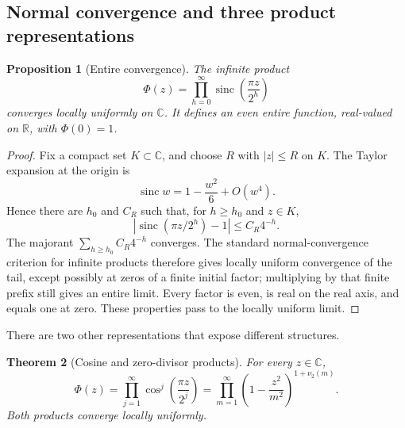 \documentclass[11pt,oneside]{article}
\numberwithin{equation}{section}
\newtheorem{theorem}{Theorem}[section]
\newtheorem{proposition}[theorem]{Proposition}
\theoremstyle{definition}
\theoremstyle{remark}
\newcommand{\R}{\mathbb R}
\newcommand{\C}{\mathbb C}
\newcommand{\abs}[1]{\left|#1\right|}
\newcommand{\sinc}{\operatorname{sinc}}
\newcommand{\PhiUp}{\Phi}
\newcommand{\nuTwo}{\nu_2}
\begin{document}
\subsection{Normal convergence and three product representations}

\begin{proposition}[Entire convergence]
\label{prop:entire-convergence}
The infinite product
\begin{equation}
 \PhiUp(z)=\prod_{h=0}^{\infty}\sinc\!\left(\frac{\pi z}{2^h}\right)
 \label{eq:Phi-def}
\end{equation}
converges locally uniformly on \(\C\).  It defines an even entire function, real-valued on
\(\R\), with \(\PhiUp(0)=1\).
\end{proposition}

\begin{proof}
Fix a compact set \(K\subset\C\), and choose \(R\) with \(\abs z\le R\) on \(K\).  The
Taylor expansion at the origin is
\[
 \sinc w=1-\frac{w^2}{6}+O(w^4).
\]
Hence there are \(h_0\) and \(C_R\) such that, for \(h\ge h_0\) and \(z\in K\),
\[
 \abs{\sinc(\pi z/2^h)-1}\le C_R4^{-h}.
\]
The majorant \(\sum_{h\ge h_0}C_R4^{-h}\) converges.  The standard normal-convergence
criterion for infinite products therefore gives locally uniform convergence of the tail,
except possibly at zeros of a finite initial factor; multiplying by that finite prefix still
gives an entire limit.  Every factor is even, is real on the real axis, and equals one at
zero.  These properties pass to the locally uniform limit.
\end{proof}

There are two other representations that expose different structures.

\begin{theorem}[Cosine and zero-divisor products]
\label{thm:three-products}
For every \(z\in\C\),
\begin{equation}
 \boxed{
 \PhiUp(z)
 =\prod_{j=1}^{\infty}\cos^j\!\left(\frac{\pi z}{2^j}\right)
 =\prod_{m=1}^{\infty}\left(1-\frac{z^2}{m^2}\right)^{1+\nuTwo(m)}.}
 \label{eq:three-products}
\end{equation}
Both products converge locally uniformly.
\end{theorem}
\end{document}
